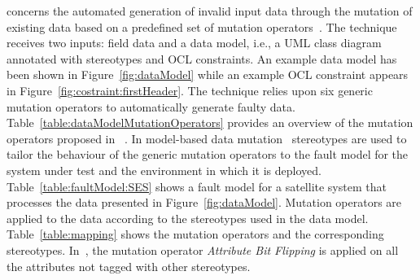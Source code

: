 


 concerns the automated generation of invalid input data through the mutation of existing data based on a predefined set of mutation operators~\cite{di2015generating}.
The technique receives two inputs: field data and a data model, i.e., a UML class diagram annotated with stereotypes and OCL constraints. 
An example data model has been shown in Figure~\ref{fig:dataModel} while an example OCL constraint appears in Figure~\ref{fig:costraint:firstHeader}. 
The technique relies upon six generic mutation operators to automatically generate faulty data. 
Table~\ref{table:dataModelMutationOperators} provides an overview of the mutation operators proposed in ~\cite{di2015generating}.
In model-based data mutation~\cite{di2015generating} stereotypes are used to tailor the behaviour of the generic mutation operators to the fault model for the system under test and the environment in which it is deployed. 
Table~\ref{table:faultModel:SES} shows a fault model for a satellite system that processes the data presented in Figure~\ref{fig:dataModel}.
Mutation operators are applied to the data according to the stereotypes used in the data model.
Table~\ref{table:mapping} shows the mutation operators and the corresponding stereotypes. In~\cite{di2015generating}, the mutation operator \emph{Attribute Bit Flipping} is applied on all the attributes not tagged with other stereotypes. 







